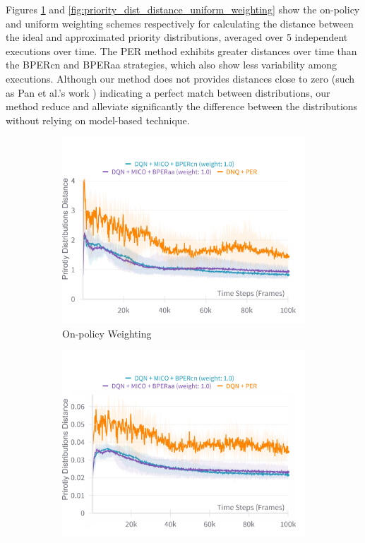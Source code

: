 Figures \ref{fig:priority_dist_distance_on_policy_weighting} and \ref{fig:priority_dist_distance_uniform_weighting} show the on-policy and uniform weighting schemes respectively for calculating the distance between the ideal and approximated priority distributions,   averaged over 5 independent executions over time. The PER method exhibits greater distances over time than the BPERcn and BPERaa strategies, which also show less variability among executions. Although our method does not provides distances close to zero (such as Pan et al.'s work \cite{pan2022understanding}) indicating a perfect match between distributions, our method reduce and alleviate significantly the difference between the distributions without relying on model-based technique. 

\begin{figure}[!h]
    \centering
    \begin{subfigure}{0.45\textwidth}
    \includegraphics[width=\linewidth]{Results/grid_world/on_policy_weighting_outdated_priorities.png}
        \caption{On-policy Weighting}
        \label{fig:priority_dist_distance_on_policy_weighting}
    \end{subfigure}
    \hfill
    \begin{subfigure}{0.45\textwidth}
        \includegraphics[width=\linewidth]{Results/grid_world/uniform_weighting_outdated_priorities.png}

\end{subfigure}
\end{figure}
